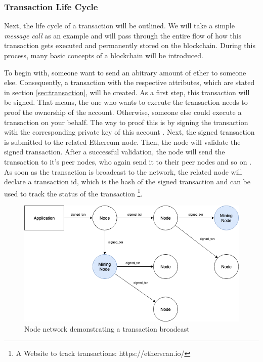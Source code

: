 \subsubsection{Transaction Life Cycle}
\label{sec:transaction_lifecycle}
Next, the life cycle of a transaction will be outlined. We will take a simple \textit{message call} as an example and will pass through the entire flow of how this transaction gets executed and permanently stored on the blockchain. During this process, many basic concepts of a blockchain will be introduced. 

To begin with, someone want to send an abitrary amount of ether to someone else. 
Consequently, a transaction with the respective attributes, which are stated 
in section \ref{sec:transaction}, will be created. As a first step, this transaction 
will be signed. That means, the one who wants to execute the transaction needs to proof the 
ownership of the account. Otherwise, someone else could execute a transaction on your behalf. 
The way to proof this is by signing the transaction with the corresponding private
key of this account . 
Next, the signed transaction is submitted to the related Ethereum node. 
Then, the node will validate the signed transaction. 
After a successful validation, the node will send the transaction to 
it's peer nodes, who again send it to their 
peer nodes and so on . 
As soon as the transaction is broadcast to the network, 
the related node will declare a transaction id, which is the hash 
of the signed transaction and can be used to track the 
status of the transaction \footnote{A Website to track transactions: https://etherscan.io/}. 

\begin{figure}[htbp]
	\centering
	\includegraphics[width=.7\linewidth]{./figures/node_network.png}
	\caption{Node network demonstrating a transaction broadcast}
	\label{figure:node_network}
\end{figure}

